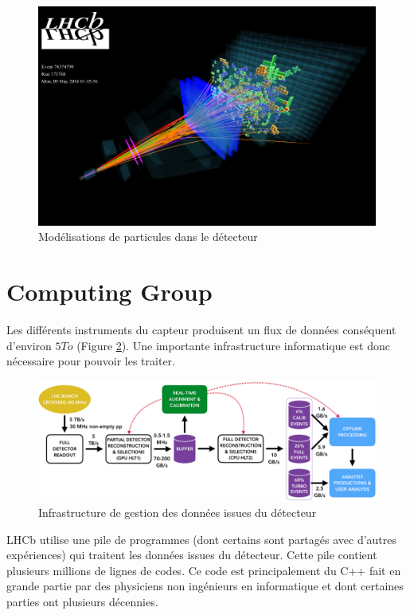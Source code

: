 \documentclass[a4paper]{report}
\begin{document}
\begin{figure}[!htb]
    \includegraphics[width=\textwidth, center]{LHCb_3D.png}
    \caption{Modélisations de particules dans le détecteur}
    \label{LHCb_3D}
\end{figure}

\section{Computing Group}
Les différents instruments du capteur produisent un flux de données conséquent d'environ $5 To$ (Figure \ref{LHCb_stack}).
Une importante infrastructure informatique est donc nécessaire pour pouvoir les traiter.

\begin{figure}[!htb]
    \includegraphics[width=\textwidth, center]{LHCb_stack.png}
    \caption{Infrastructure de gestion des données issues du détecteur}
    \label{LHCb_stack}
\end{figure}

LHCb utilise une pile de programmes (dont certains sont partagés avec d'autres expériences) qui traitent les données issues du détecteur.
Cette pile contient plusieurs millions de lignes de codes.
Ce code est principalement du C++ fait en grande partie par des physiciens non ingénieurs en informatique et dont certaines parties ont plusieurs décennies.
\end{document}
